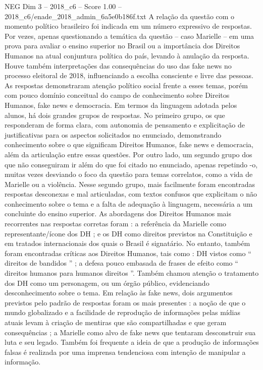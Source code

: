 \begin{textsample}{NEG Dim 3 – 2018\_c6 – Score 1.00 – 2018\_c6/enade\_2018\_admin\_6a5e0b186f.txt}
A relação da questão com o momento político brasileiro foi indicada em um número expressivo de respostas.
Por vezes, apenas questionando a temática da questão – caso Marielle – em uma prova para avaliar o ensino superior no Brasil ou a importância dos Direitos Humanos na atual conjuntura política do país, levando à anulação da resposta.
Houve também interpretações das consequências do uso das fake news no processo eleitoral de 2018, influenciando a escolha consciente e livre das pessoas.
As respostas demonstraram atenção político social frente a esses temas, porém com pouco domínio conceitual do campo de conhecimento sobre Direitos Humanos, fake news e democracia.
Em termos da linguagem adotada pelos alunos, há dois grandes grupos de respostas.
No primeiro grupo, os que responderam de forma clara, com autonomia de pensamento e explicitação de justificativas para os aspectos solicitados no enunciado, demonstrando conhecimento sobre o que significam Direitos Humanos, fake news e democracia, além da articulação entre essas questões.
Por outro lado, um segundo grupo dos que não conseguiram ir além do que foi citado no enunciado, apenas repetindo -o, muitas vezes desviando o foco da questão para temas correlatos, como a vida de Marielle ou a violência.
Nesse segundo grupo, mais facilmente foram encontradas respostas desconexas e mal articuladas, com textos confusos que explicitam o não conhecimento sobre o tema e a falta de adequação à linguagem, necessária a um concluinte do ensino superior.
As abordagens dos Direitos Humanos mais recorrentes nas respostas corretas foram : a referência da Marielle como representante/ícone dos DH ; e os DH como direitos previstos na Constituição e em tratados internacionais dos quais o Brasil é signatário.
No entanto, também foram encontradas críticas aos Direitos Humanos, tais como : DH vistos como “ direitos de bandidos ” ; a defesa pouco embasada de frases de efeito como “ direitos humanos para humanos direitos ”.
Também chamou atenção o tratamento dos DH como um personagem, ou um órgão público, evidenciando desconhecimento sobre o tema.
Em relação às fake news, dois argumentos previstos pelo padrão de respostas foram os mais presentes : a noção de que o mundo globalizado e a facilidade de reprodução de informações pelas mídias atuais levam à criação de mentiras que são compartilhadas e que geram consequências ; a Marielle como alvo de fake news que tentaram desconstruir sua luta e seu legado.
Também foi frequente a ideia de que a produção de informações falsas é realizada por uma imprensa tendenciosa com intenção de manipular a informação.

\end{textsample}
